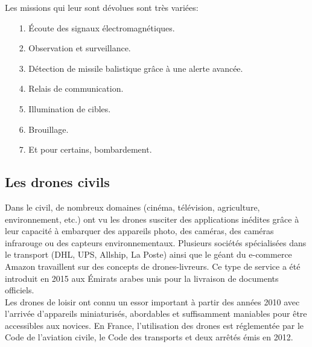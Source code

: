 
 
Les missions qui leur sont dévolues sont très variées:  ~\\

\begin{itemize}
\item[1.] Écoute des signaux électromagnétiques.
\item[2.]    Observation et surveillance. 
\item[3.]    Détection de missile balistique grâce à une alerte avancée. 
\item[4.]    Relais de communication. 
\item[5.]    Illumination de cibles. 
\item[6.]    Brouillage. 
\item[7.]     Et pour certains, bombardement. 
\end{itemize}
 

\subsection{Les drones civils }

Dans le civil, de nombreux domaines (cinéma, télévision, agriculture, environnement, etc.) ont vu les drones susciter des applications inédites grâce à leur capacité à embarquer des appareils photo, des caméras, des caméras infrarouge ou des capteurs environnementaux. Plusieurs sociétés spécialisées dans le transport (DHL, UPS, Allship, La Poste) ainsi que le géant du e-commerce Amazon travaillent sur des concepts de drones-livreurs. Ce type de service a été introduit en 2015 aux Émirats arabes unis pour la livraison de documents officiels.  ~\\

Les drones de loisir ont connu un essor important à partir des années 2010 avec l’arrivée d’appareils miniaturisés, abordables et suffisamment maniables pour être accessibles aux novices. En France, l'utilisation des drones est réglementée par le Code de l’aviation civile, le Code des transports et deux arrêtés émis en 2012. 



